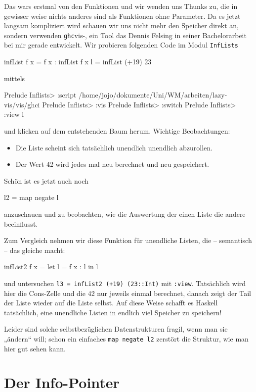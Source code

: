 \documentclass[11pt,DIV=12,parskip=half,headings=normal,abstract]{scrartcl}
\newcommand{\li}{\lstinline[style=haskell]}
\begin{document}
Das wars erstmal von den Funktionen und wir wenden uns Thunks zu, die in gewisser weise nichts anderes sind als Funktionen ohne Parameter. Da es jetzt langsam kompliziert wird schauen wir uns nicht mehr den Speicher direkt an, sondern verwenden \li-ghc-vis-, ein Tool das Dennis Felsing in seiner Bachelorarbeit bei mir gerade entwickelt. Wir probieren folgenden Code im Modul \li-InfLists-
\begin{haskell}
infList f x = f x : infList f x
l = infList (+19) 23
\end{haskell}
mittels
\begin{ghci}
Prelude Inflists> :script /home/jojo/dokumente/Uni/WM/arbeiten/lazy-vis/vis/ghci
Prelude Inflists> :vis
Prelude Inflists> :switch
Prelude Inflists> :view l
\end{ghci}
und klicken auf dem entstehenden Baum herum. Wichtige Beobachtungen:
\begin{itemize}
\item Die Liste scheint sich tatsächlich unendlich unendlich abzurollen.
\item Der Wert 42 wird jedes mal neu berechnet und neu gespeichert.
\end{itemize}

Schön ist es jetzt auch noch
\begin{haskell}
l2 = map negate l
\end{haskell}
anzuschauen und zu beobachten, wie die Auswertung der einen Liste die andere beeinflusst.

Zum Vergleich nehmen wir diese Funktion für unendliche Listen, die -- semantisch -- das gleiche macht:
\begin{haskell}
infList2 f x = let l = f x : l in l
\end{haskell}
und untersuchen \li-l3 = infList2 (+19) (23::Int)- mit \li-:view-. Tatsächlich wird hier die Cons-Zelle und die 42 nur jeweils einmal berechnet, danach zeigt der Tail der Liste wieder auf die Liste selbst. Auf diese Weise schafft es Haskell tatsächlich, eine unendliche Listen in endlich viel Speicher zu speichern!

Leider sind solche selbstbezüglichen Datenstrukturen fragil, wenn man sie „ändern“ will; schon ein einfaches \li-map negate l2- zerstört die Struktur, wie man hier gut sehen kann.



\section{Der Info-Pointer}
\end{document}
